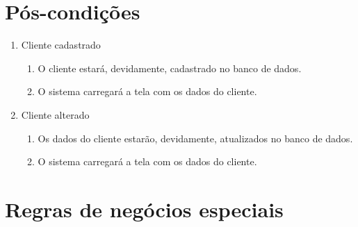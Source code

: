 \section{Pós-condições}

\begin{enumerate}
	\item Cliente cadastrado
	\begin{enumerate}
		\item O cliente estará, devidamente, cadastrado no banco de dados.
		\item O sistema carregará a tela com os dados do cliente.
	\end{enumerate}

	\item Cliente alterado
	\begin{enumerate}
		\item Os dados do cliente estarão, devidamente, atualizados no banco de dados.
		\item O sistema carregará a tela com os dados do cliente.
	\end{enumerate}
\end{enumerate}

\section{Regras de negócios especiais}

